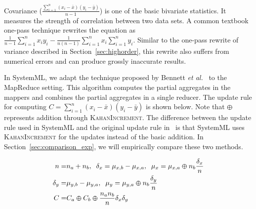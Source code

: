 Covariance ($\frac{\sum\limits_{i=1}^{n}(x_i-\bar{x})(y_i-\bar{y})}{n-1}$) is one of the basic bivariate statistics. It measures the strength of correlation between two data sets. A common textbook one-pass technique rewrites the equation as $\frac{1}{n-1}\sum\limits_{i=1}^{n}x_iy_i-\frac{1}{n(n-1)}\sum\limits_{i=1}^{n}x_i\sum\limits_{i=1}^{n}y_i$. Similar to the one-pass rewrite of variance described in Section~\ref{sec:highorder}, this rewrite also suffers from numerical errors and can produce grossly inaccurate results. 


In SystemML, we adapt the technique proposed by Bennett {\em et al.}~\cite{cm} to the MapReduce setting. This algorithm computes the partial aggregates in the mappers and combines the partial aggregates in a single reducer. The update rule for computing $C=\sum\limits_{i=1}^{n}(x_i-\bar{x})(y_i-\bar{y})$ is shown below. Note that $\varoplus$ represents addition through \textsc{KahanIncrement}. The difference between the update rule used in SystemML and the original update rule in~\cite{cm} is that SystemML uses \textsc{KahanIncrement} for the updates instead of the basic addition. In Section~\ref{sec:comparison_exp}, we will empirically compare these two methods.

\begin{small}
\begin{equation}
\begin{split}
n=& n_a+n_b, \;\; \delta_x=\mu_{x,b}-\mu_{x,a}, \;\; \mu_x=\mu_{x,a}\varoplus n_b\frac{\delta_x}{n} \\
\delta_y=& \mu_{y,b}-\mu_{y,a}, \;\; \mu_y=\mu_{y,a}\varoplus n_b\frac{\delta_y}{n} \\
C =& C_a\varoplus C_b\varoplus \frac{n_an_b}{n}\delta_x\delta_y
\end{split}
\label{eq:coveq}
\end{equation}
\end{small}

